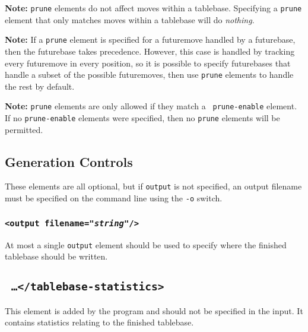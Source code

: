 \documentclass[11pt]{article}
\begin{document}
{\bf Note:} {\tt prune} elements do not affect moves within a
tablebase.  Specifying a {\tt prune} element that only matches
moves within a tablebase will do {\it nothing}.

{\bf Note:} If a {\tt prune} element is specified for a futuremove
handled by a futurebase, then the futurebase takes precedence.
However, this case is handled by tracking every futuremove in every
position, so it is possible to specify futurebases that handle a
subset of the possible futuremoves, then use {\tt prune} elements to
handle the rest by default.

{\bf Note:} {\tt prune} elements are only allowed if they match a {\tt
prune-enable} element.  If no {\tt prune-enable} elements were
specified, then no {\tt prune} elements will be permitted.

\subsection{Generation Controls}

These elements are all optional, but if {\tt output} is not specified,
an output filename must be specified on the command line using
the {\tt -o} switch.

\subsubsection{\tt <output filename="{\it string}"/>}

At most a single {\tt output} element should be used to specify where
the finished tablebase should be written.

\vfill\eject

\subsection{\tt <tablebase-statistics> \ldots\quad </tablebase-statistics>}

This element is added by the program and should not be specified in the
input.  It contains statistics relating to the finished tablebase.
\end{document}
